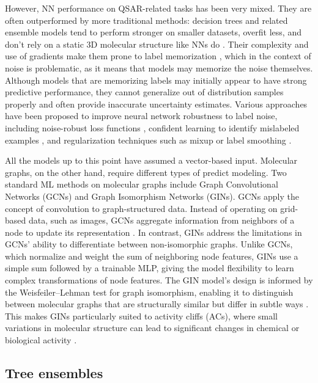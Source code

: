 However, NN performance on QSAR-related tasks has been very mixed. They are often outperformed by more traditional methods: decision trees and related ensemble models tend to perform stronger on smaller datasets, overfit less, and don't rely on a static 3D molecular structure like NNs do \citep{Baskin2008, Koutsoukas2017}. Their complexity and use of gradients make them prone to label memorization \citep{Zhang2017}, which in the context of noise is problematic, as it means that models may memorize the noise themselves. Although models that are memorizing labels may initially appear to have strong predictive performance, they cannot generalize out of distribution samples properly and often provide inaccurate uncertainty estimates. Various approaches have been proposed to improve neural network robustness to label noise, including noise-robust loss functions \citep{Zhang2017}, confident learning to identify mislabeled examples \citep{Northcutt2021}, and regularization techniques such as mixup or label smoothing \citep{Zhang2017}. 

All the models up to this point have assumed a vector-based input. Molecular graphs, on the other hand, require different types of predict modeling. Two standard ML methods on molecular graphs include Graph Convolutional Networks (GCNs) and Graph Isomorphism Networks (GINs). GCNs apply the concept of convolution to graph-structured data. Instead of operating on grid-based data, such as images, GCNs aggregate information from neighbors of a node to update its representation \citep{TeachOpenCADD2023, Xu2019}. In contrast, GINs address the limitations in GCNs’ ability to differentiate between non-isomorphic graphs. Unlike GCNs, which normalize and weight the sum of neighboring node features, GINs use a simple sum followed by a trainable MLP, giving the model flexibility to learn complex transformations of node features. The GIN model’s design is informed by the Weisfeiler--Lehman test for graph isomorphism, enabling it to distinguish between molecular graphs that are structurally similar but differ in subtle ways \citep{TeachOpenCADD2023, Xu2019}. This makes GINs particularly suited to activity cliffs (ACs), where small variations in molecular structure can lead to significant changes in chemical or biological activity \citep{TeachOpenCADD2023}. 


\subsection{Tree ensembles}


